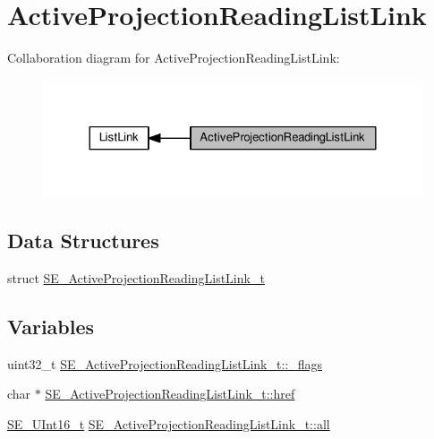 \hypertarget{group__ActiveProjectionReadingListLink}{}\section{Active\+Projection\+Reading\+List\+Link}
\label{group__ActiveProjectionReadingListLink}
Collaboration diagram for Active\+Projection\+Reading\+List\+Link\+:\nopagebreak
\begin{figure}[H]
\begin{center}
\leavevmode
\includegraphics[width=324pt]{group__ActiveProjectionReadingListLink}
\end{center}
\end{figure}
\subsection*{Data Structures}
\begin{DoxyCompactItemize}
\item 
struct \hyperlink{structSE__ActiveProjectionReadingListLink__t}{S\+E\+\_\+\+Active\+Projection\+Reading\+List\+Link\+\_\+t}
\end{DoxyCompactItemize}
\subsection*{Variables}
\begin{DoxyCompactItemize}
\item 
uint32\+\_\+t \hyperlink{group__ActiveProjectionReadingListLink_ga6816bac33a95b7122188dfd08ed74309}{S\+E\+\_\+\+Active\+Projection\+Reading\+List\+Link\+\_\+t\+::\+\_\+flags}
\item 
char $\ast$ \hyperlink{group__ActiveProjectionReadingListLink_ga4ad9d924109e8d23a60f84f807a6e316}{S\+E\+\_\+\+Active\+Projection\+Reading\+List\+Link\+\_\+t\+::href}
\item 
\hyperlink{group__UInt16_gac68d541f189538bfd30cfaa712d20d29}{S\+E\+\_\+\+U\+Int16\+\_\+t} \hyperlink{group__ActiveProjectionReadingListLink_gaac6fb00ec846fd582cfa39237ddcdb81}{S\+E\+\_\+\+Active\+Projection\+Reading\+List\+Link\+\_\+t\+::all}
\end{DoxyCompactItemize}



